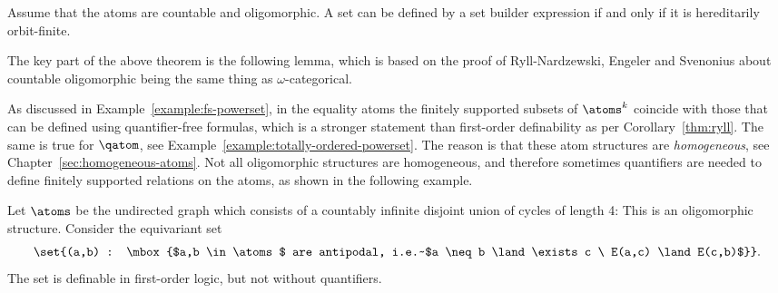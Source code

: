 



\begin{theorem}\label{thm:definable-is-hof}
	Assume that the atoms are countable and oligomorphic. A set can be defined by a set builder expression if and only if it is hereditarily orbit-finite.
\end{theorem}

The key part of the above theorem is the following lemma, which is based on the proof of Ryll-Nardzewski, Engeler and Svenonius about countable oligomorphic being the same thing as $\omega$-categorical. 


As discussed in Example~\ref{example:fs-powerset}, in the equality atoms the finitely supported subsets of $\atoms^k$ coincide with those that can be defined using quantifier-free formulas, which is a stronger statement than first-order definability as per Corollary~\ref{thm:ryll}. The same is true for $\qatom$, see Example~\ref{example:totally-ordered-powerset}. The reason is that these atom structures are \emph{homogeneous}, see Chapter~\ref{sec:homogeneous-atoms}. Not all oligomorphic structures are homogeneous, and therefore sometimes quantifiers are needed to define finitely supported relations on the atoms, as shown in the following example.

\begin{myexample}
	Let $\atoms$ be the undirected graph which consists of a countably infinite disjoint union of cycles of length 4: 
	This is an oligomorphic structure. Consider the equivariant set
	\begin{align*}
		\set{(a,b) : \mbox{$a,b \in \atoms$ are antipodal, i.e.~$a \neq b \land \exists c \ E(a,c) \land E(c,b)$}}.
	\end{align*}
The set is definable in first-order logic, but not without quantifiers.
\end{myexample}


